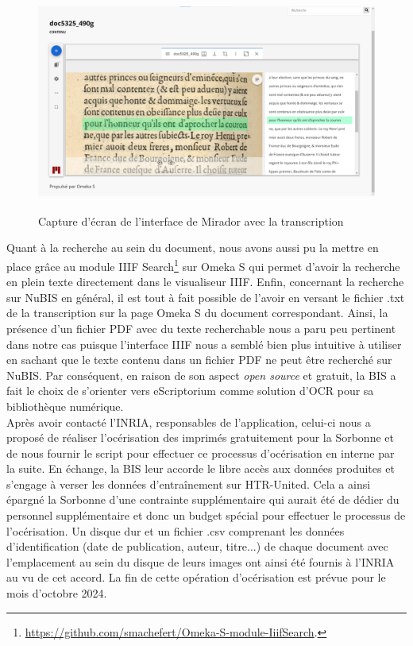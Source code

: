 \documentclass[a4paper,12pt,twoside]{book}
\begin{document}
\begin{figure} [H]
	\includegraphics[width=6.21736in,height=2.84514in]{vertopal_157ae480aa4a4b07be198b586a812241/media/image15.png}
	\caption{Capture d'écran de l'interface de Mirador avec la transcription}
\end{figure}



Quant à la recherche au sein du document, nous avons aussi pu la mettre
en place grâce au module IIIF Search\footnote{\url{https://github.com/smachefert/Omeka-S-module-IiifSearch}.}
sur Omeka S qui permet d'avoir la recherche en plein texte directement
dans le visualiseur IIIF. Enfin, concernant la recherche sur NuBIS en
général, il est tout à fait possible de l'avoir en versant le fichier
.txt de la transcription sur la page Omeka S du document correspondant.
Ainsi, la présence d'un fichier PDF avec du texte recherchable nous a
paru peu pertinent dans notre cas puisque l'interface IIIF nous a semblé
bien plus intuitive à utiliser en sachant que le texte contenu dans un
fichier PDF ne peut être recherché sur NuBIS. Par conséquent, en raison
de son aspect \emph{open source} et gratuit, la BIS a fait le choix de
s'orienter vers eScriptorium comme solution d'OCR pour sa bibliothèque
numérique. \\

Après avoir contacté l'INRIA, responsables de l'application,
celui-ci nous a proposé de réaliser l'océrisation des imprimés gratuitement
pour la Sorbonne et de nous fournir le script pour effectuer ce processus d'océrisation en interne par la suite. En échange, la BIS leur accorde le libre accès aux données
produites et s'engage à verser les données d'entraînement sur HTR-United. Cela a ainsi épargné la Sorbonne d'une contrainte supplémentaire
qui aurait été de dédier du personnel supplémentaire et donc un
budget spécial pour effectuer le processus de l'océrisation. Un disque dur et un fichier .csv comprenant les données d'identification (date de publication, auteur, titre...) de chaque document avec l'emplacement au sein du disque de leurs images ont ainsi été fournis à l'INRIA au vu de cet accord. La fin de cette opération d'océrisation est prévue pour le mois d'octobre 2024. \\
\end{document}
